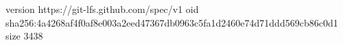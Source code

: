version https://git-lfs.github.com/spec/v1
oid sha256:4a4268af4f0af8e003a2eed47367db0963c5fa1d2460e74d71ddd569cb86c0d1
size 3438
